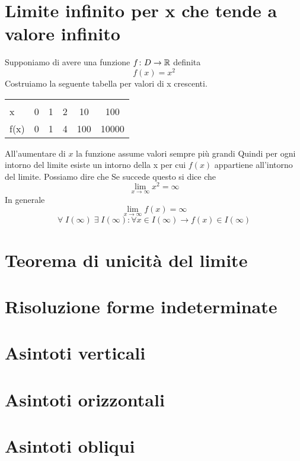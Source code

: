\section{Limite infinito per x che tende a valore infinito}
Supponiamo di avere una funzione $f\colon D\to{}\mathbb{R}$ definita \[f(x)=x^2\] 
Costruiamo la seguente tabella per valori di x crescenti.
\begin{center}
	\begin{tabular}{@{}L*{5}{c}}
		\toprule
		&&&\\
		x& 0 & 1 &2&10&100\\
		\cmidrule(r){2-6} 
		f(x)	&0&1&4&100&10000\\
		\bottomrule
	\end{tabular}
\end{center}
All'aumentare di $x$ la funzione assume valori sempre più grandi
Quindi per ogni intorno del limite esiste un intorno della x per cui $f(x)$ appartiene all'intorno del limite. Possiamo dire che  Se succede questo si dice che \[\lim_{x\to \infty}x^2=\infty \]
In generale \begin{equation*}
\lim_{x\to \infty}f(x)=\infty
\end{equation*}
\begin{equation*}
\forall\; I(\infty)\; \exists\; I(\infty) : \forall x\in I(\infty) \longrightarrow f(x)\in I(\infty)
\end{equation*}
 \section{Teorema di unicità del limite}
 \section{Risoluzione forme indeterminate}
 \section{Asintoti verticali}
 \section{Asintoti orizzontali}
 \section{Asintoti obliqui}